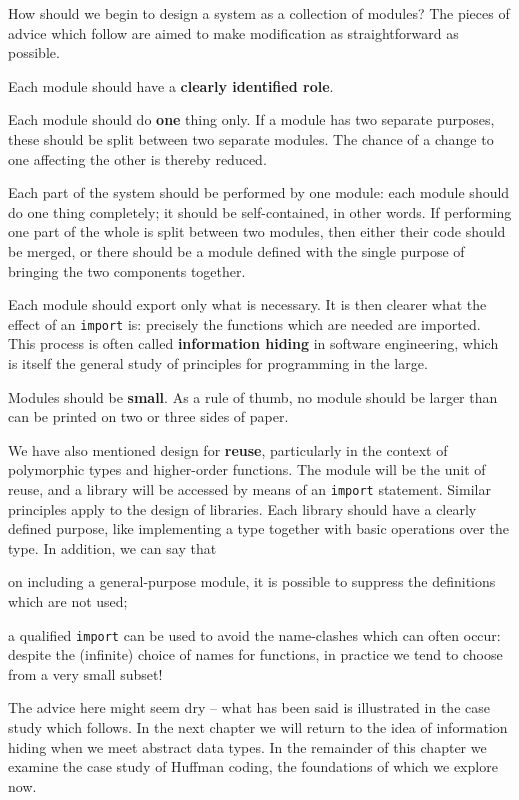 How should we begin to design a system as a collection of modules? The pieces
of advice which follow are aimed to make modification as straightforward as
possible.
\begin{titemize}
\item Each module should have a \textbf{clearly identified role}.
\item Each module should do \textbf{one} thing only. If a module has two
separate purposes, these should be split between two separate modules. The
chance of a change to one affecting the other is thereby reduced.  
\item Each part of the system should be performed by one module: each module
should do one thing completely; it should be self-contained, in other
words. If performing one part of the whole is split between two modules, then
either their code should be merged, or there should be a module defined with
the single purpose of bringing the two components together. 
\item Each module should export only what is necessary. It is then
clearer what the effect of an \texttt{import} is: precisely the
functions which are needed are imported. This process is often called
\textbf{information hiding} 
in software engineering, which is itself the general
study of principles for programming in the large.
\item Modules should be \textbf{small}. As a rule of thumb, no module should be
larger than can be printed on two or three sides of paper.  
\end{titemize}
We
have also mentioned design for \textbf{reuse}, particularly in the context of
polymorphic types and higher-order functions. The module will be the unit of
reuse, and a library will be accessed by means
of an \texttt{import} statement. Similar principles apply to the design of
libraries. Each library should have a clearly defined purpose, like
implementing a type together with basic operations over the type. In addition,
we can say that  
\begin{titemize}
\item on including a general-purpose module, it
is possible to suppress the definitions which are not used;
\item a qualified \texttt{import} can be used to avoid the name-clashes
which can often occur: despite the (infinite) choice of names for functions,
in practice we tend to choose from a very small subset! 
\end{titemize}
The advice here might seem dry -- what has
been said is illustrated in the case study which follows. In the next chapter we will return
to the idea of information hiding when we meet abstract data types. In the
remainder of this chapter we examine the case study of Huffman coding, the 
foundations of which we explore now.



